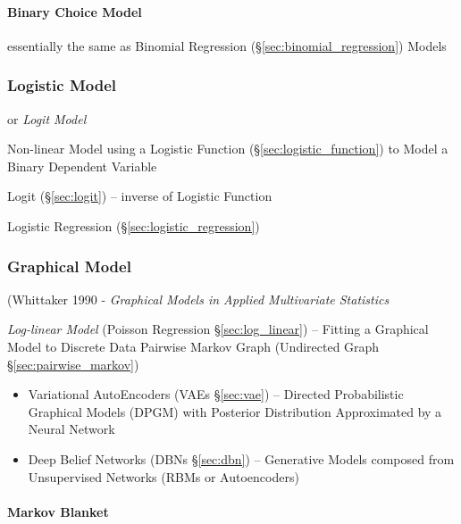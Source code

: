\paragraph{Binary Choice Model}\label{sec:binary_choice}\hfill

essentially the same as Binomial Regression
(\S\ref{sec:binomial_regression}) Models



\subsubsection{Logistic Model}\label{sec:logistic_model}

or \emph{Logit Model}

Non-linear Model using a Logistic Function (\S\ref{sec:logistic_function}) to
Model a Binary Dependent Variable

Logit (\S\ref{sec:logit}) -- inverse of Logistic Function

Logistic Regression (\S\ref{sec:logistic_regression})



\subsubsection{Graphical Model}\label{sec:graphical_model}

(Whittaker 1990 - \emph{Graphical Models in Applied Multivariate Statistics}

\fist \emph{Log-linear Model} (Poisson Regression \S\ref{sec:log_linear}) --
Fitting a Graphical Model to Discrete Data \fist Pairwise Markov Graph
(Undirected Graph \S\ref{sec:pairwise_markov})

\begin{itemize}
  \item Variational AutoEncoders (VAEs \S\ref{sec:vae}) -- Directed
    Probabilistic Graphical Models (DPGM) with Posterior Distribution
    Approximated by a Neural Network
  \item Deep Belief Networks (DBNs \S\ref{sec:dbn}) -- Generative Models
    composed from Unsupervised Networks (RBMs or Autoencoders)
\end{itemize}



\paragraph{Markov Blanket}\label{sec:markov_blanket}\hfill

